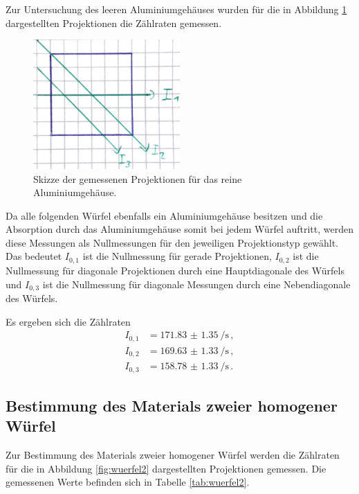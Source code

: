 Zur Untersuchung des leeren Aluminiumgehäuses wurden für die in Abbildung \ref{fig:wuerfel1} dargestellten Projektionen die Zählraten gemessen.

\begin{figure}
  \centering
  \includegraphics[width=0.5\textwidth]{images/wuerfel1.jpg}
  \caption{Skizze der gemessenen Projektionen für das reine Aluminiumgehäuse.}
  \label{fig:wuerfel1}
\end{figure}

Da alle folgenden Würfel ebenfalls ein Aluminiumgehäuse besitzen und die Absorption durch das Aluminiumgehäuse somit bei jedem Würfel auftritt, werden
diese Messungen als Nullmessungen für den jeweiligen Projektionstyp gewählt. Das bedeutet $I_{0,1}$ ist die Nullmessung für gerade Projektionen,  $I_{0,2}$ ist die Nullmessung für diagonale Projektionen durch eine Hauptdiagonale des Würfels
und $I_{0,3}$ ist die Nullmessung für diagonale Messungen durch eine Nebendiagonale des Würfels.

Es ergeben sich die Zählraten
\begin{align*}
  I_{0,1}&=\SI{171.83(135)}{\per\second} \,, \\
  I_{0,2}&=\SI{169.63(133)}{\per\second} \,, \\
  I_{0,3}&=\SI{158.78(133)}{\per\second} \,.
\end{align*}

\subsection{Bestimmung des Materials zweier homogener Würfel}
Zur Bestimmung des Materials zweier homogener Würfel werden die Zählraten für die
in Abbildung \ref{fig:wuerfel2} dargestellten Projektionen gemessen. Die gemessenen Werte befinden sich in Tabelle \ref{tab:wuerfel2}.

